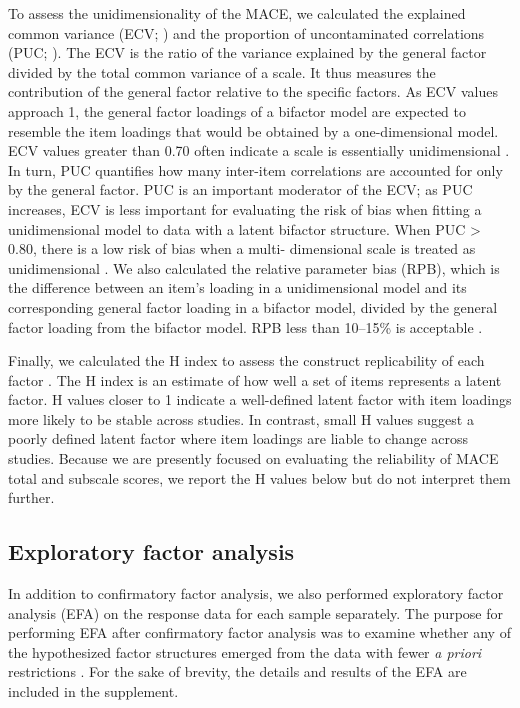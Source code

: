 \documentclass[letterpaper,man,natbib,noextraspace,floatsintext,longtable,12pt]{apa6}
\begin{document}
To assess the unidimensionality of the MACE, we calculated the explained common variance (ECV; \citealt{sijtsma2009use}) and the proportion of uncontaminated correlations (PUC; \citealt{reise2013multidimensionality}). The ECV is the ratio of the variance explained by the general factor divided by the total common variance of a scale. It thus measures the contribution of the general factor relative to the specific factors. As ECV values approach 1, the general factor loadings of a bifactor model are expected to resemble the item loadings that would be obtained by a one-dimensional model. ECV values greater than 0.70 often indicate a scale is essentially unidimensional \citep{rodriguez2016applying}. In turn, PUC quantifies how many inter-item correlations are accounted for only by the general factor. PUC is an important moderator of the ECV; as PUC increases, ECV is less important for evaluating the risk of bias when fitting a unidimensional model to data with a latent bifactor structure. When PUC > 0.80, there is a low risk of bias when a multi- dimensional scale is treated as unidimensional \citep{reise2013multidimensionality}. We also calculated the relative parameter bias (RPB), which is the difference between an item's loading in a unidimensional model and its corresponding general factor loading in a bifactor model, divided by the general factor loading from the bifactor model. RPB less than 10–15\% is acceptable \citep{muthen1987structural}.

Finally, we calculated the H index to assess the construct replicability of each factor \citep{hancock2001rethinking}. The H index is an estimate of how well a set of items represents a latent factor. H values closer to 1 indicate a well-defined latent factor with item loadings more likely to be stable across studies. In contrast, small H values suggest a poorly defined latent factor where item loadings are liable to change across studies. Because we are presently focused on evaluating the reliability of MACE total and subscale scores, we report the H values below but do not interpret them further.

\subsection{Exploratory factor analysis}

In addition to confirmatory factor analysis, we also performed exploratory factor analysis (EFA) on the response data for each sample separately. The purpose for performing EFA after confirmatory factor analysis was to examine whether any of the hypothesized factor structures emerged from the data with fewer \textit{a priori} restrictions \citep{schmitt2018selecting}. For the sake of brevity, the details and results of the EFA are included in the supplement. 
\end{document}
